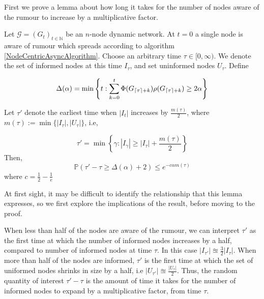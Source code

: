First we prove a lemma about how long it takes for the number of nodes aware of the rumour to increase by a multiplicative factor. 

\begin{lemma} \label{AsyncIncreaseLemma}
	Let $\mathcal{G}=(G_t)_{t \in \mathbb{N}}$ be an $n$-node dynamic network. At $t=0$ a single node is aware of rumour which spreads according to algorithm \ref{NodeCentricAsyncAlgorithm}. Choose an arbitrary time $\tau \in [0, \infty)$. We denote the set of informed nodes at this time $I_\tau$, and set uninformed nodes $U_\tau$.
	\noindent
	Define 
	
	$$
	\Delta(\alpha) = \min \left\{t: \sum_{k=0}^t \Phi(G_{\lceil\tau\rceil+k})\rho(G_{\lceil\tau\rceil+k}) \geq 2 \alpha \right\}
	$$

	\noindent
	Let $\tau'$ denote the earliest time when $|I_t|$ increases by $\frac{m(\tau)}{2}$, where $m(\tau) := \min\{|I_\tau|, |U_\tau|\}$, i.e,

	$$
		\tau' = \min\left\{\gamma : |I_{\gamma}| \geq |I_\tau| + \frac{m(\tau)}{2}\right\}
	$$
	\noindent
	Then, 
	$$
		\mathbb{P}(\tau' - \tau \geq \Delta(\alpha) + 2) \leq e^{-c\alpha m(\tau)}
	$$
	\noindent
	where $c = \frac{1}{2} - \frac{1}{e}$
\end{lemma}


At first sight, it may be difficult to identify the relationship that this lemma expresses, so we first explore the implications of the result, before moving to the proof.

When less than half of the nodes are aware of the rumour, we can interpret $\tau'$ as the first time at which the number of informed nodes increases by a half, compared to number of informed nodes at time $\tau$. In this case $|I_{\tau'}| \approxeq \frac{3}{2} |I_\tau|$. When more than half of the nodes are informed, $\tau'$ is the first time at which the set of uniformed nodes shrinks in size by a half, i.e $|U_{\tau'}| \approxeq \frac{|U_\tau|}{2}$. Thus, the random quantity of interest $\tau'-\tau$ is the amount of time it takes for the number of informed nodes to expand by a multiplicative factor, from time $\tau$. 

